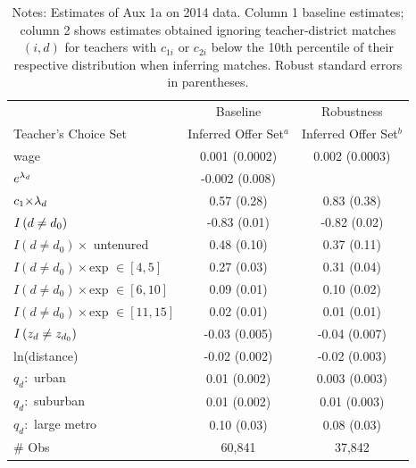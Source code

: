 \documentclass[notitlepage,12pt]{article}%
\begin{document}
\begin{table}[tbh]
\caption{OLS of Teacher-District Matches (Aux 1a): Baseline and Excluding
Matches for Teachers with $c_{1i}$ or $c_{2i}$ Below the 10th Percentile }%
\label{tab:aux1_perc}
\begin{center}%
\begin{tabular}
[c]{lcc}
&  & \\\hline\hline
& {\small Baseline} & {\small Robustness}\\
{\small Teacher's Choice Set} & {\small Inferred Offer Set}$^{a}$ &
{\small Inferred Offer Set}$^{b}$\\\hline
{\small wage} & {\small 0.001 (0.0002)} & {\small 0.002 (0.0003)}\\
${\small e}^{\lambda_{d}}$ & {\small -0.002 (0.008)} & {\small -0.008
(0.012)\\
${\small c}_{1}{\small \times\lambda}_{d}$ & {\small 0.57 (0.28)} &
{\small 0.83 (0.38)}\\
${\small I}\left(  d\neq d_{0}\right)  $ & {\small -0.83 (0.01)} &
{\small -0.82 (0.02)}\\
$I\left(  d\neq d_{0}\right)  \times$ {\small untenured} & {\small 0.48
(0.10)} & {\small 0.37 (0.11)}\\
$I\left(  d\neq d_{0}\right)  \times${\small exp $\in[4,5]$} & {\small 0.27
(0.03)} & {\small 0.31 (0.04)}\\
$I\left(  d\neq d_{0}\right)  \times${\small exp $\in[6,10]$} & {\small 0.09
(0.01)} & {\small 0.10 (0.02)}\\
$I\left(  d\neq d_{0}\right)  \times${\small exp $\in[11,15]$} & {\small 0.02
(0.01)} & {\small 0.01 (0.01)}\\
${\small I}\left(  z_{d}\neq z_{d_{0}}\right)  $ & {\small -0.03 (0.005)} &
{\small -0.04 (0.007)}\\
{\small ln(distance)} & {\small -0.02 (0.002)} & {\small -0.02 (0.003)}\\
$q_{d}:$ {\small urban} & {\small 0.01 (0.002)} & {\small 0.003 (0.003)}\\
$q_{d}:$ {\small suburban} & {\small 0.01 (0.002)} & {\small 0.01 (0.003)}\\
$q_{d}:$ {\small large metro} & {\small 0.10 (0.03)} & {\small 0.08
(0.03)}\\\hline
{\small \# Obs} & {\small 60,841} & 37,842\\\hline\hline
\end{tabular}
\end{center}
\par
\caption*{{\footnotesize Notes: Estimates of Aux 1a on 2014 data. Column 1 baseline
estimates; column 2 shows estimates obtained ignoring teacher-district matches
$\left(  i,d\right)  $ for teachers with $c_{1i}$ or $c_{2i}$ below the 10th
percentile of their respective distribution when inferring matches. Robust
standard errors in parentheses.}}\end{table}
\end{document}
